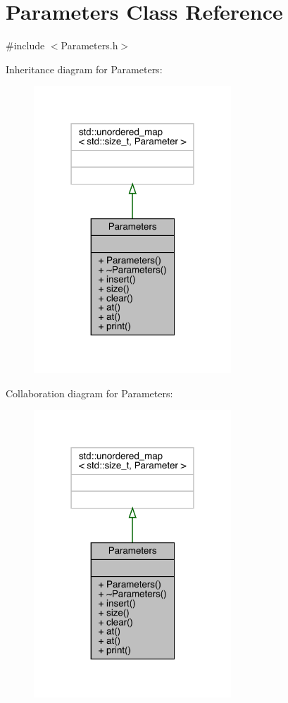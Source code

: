 \hypertarget{class_parameters}{}\section{Parameters Class Reference}
\label{class_parameters}


{\ttfamily \#include $<$Parameters.\+h$>$}



Inheritance diagram for Parameters\+:
\nopagebreak
\begin{figure}[H]
\begin{center}
\leavevmode
\includegraphics[width=210pt]{class_parameters__inherit__graph}
\end{center}
\end{figure}


Collaboration diagram for Parameters\+:
\nopagebreak
\begin{figure}[H]
\begin{center}
\leavevmode
\includegraphics[width=210pt]{class_parameters__coll__graph}
\end{center}
\end{figure}

